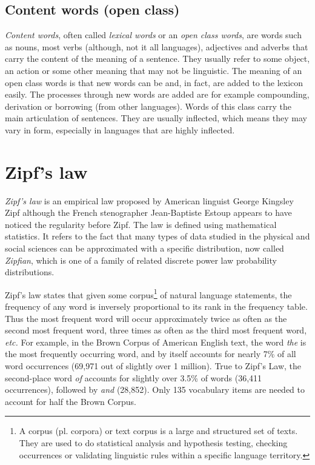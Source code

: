     \subsection{Content words (open class)}

      \emph{Content words}, often called \emph{lexical words} or an \emph{open class words}, are words such as nouns, most verbs (although, not it all languages), adjectives and adverbs that carry the content of the meaning of a sentence. They usually refer to some object, an action or some other meaning that may not be linguistic. The meaning of an open class words is that new words can be and, in fact, are added to the lexicon easily. The processes through new words are added are for example compounding, derivation or borrowing (from other languages). Words of this class carry the main articulation of sentences. They are usually inflected, which means they may vary in form, especially in languages that are highly inflected.

  \section{Zipf's law}

    \emph{Zipf's law} is an empirical law proposed by American linguist George Kingsley Zipf\cite{Zipf1935,Zipf1949} although the French stenographer Jean-Baptiste Estoup appears to have noticed the regularity before Zipf\cite{ManningSchutze1999}. The law is defined using mathematical statistics. It refers to the fact that many types of data studied in the physical and social sciences can be approximated with a specific distribution, now called \emph{Zipfian}, which is one of a family of related discrete power law probability distributions.

      Zipf's law states that given some corpus\footnote{A corpus (pl. corpora) or text corpus is a large and structured set of texts. They are used to do statistical analysis and hypothesis testing, checking occurrences or validating linguistic rules within a specific language territory.} of natural language statements, the frequency of any word is inversely proportional to its rank in the frequency table. Thus the most frequent word will occur approximately twice as often as the second most frequent word, three times as often as the third most frequent word, \emph{etc.} For example, in the Brown Corpus of American English text, the word \emph{the} is the most frequently occurring word, and by itself accounts for nearly 7\% of all word occurrences (69,971 out of slightly over 1 million). True to Zipf's Law, the second-place word \emph{of} accounts for slightly over 3.5\% of words (36,411 occurrences), followed by \emph{and} (28,852). Only 135 vocabulary items are needed to account for half the Brown Corpus.

